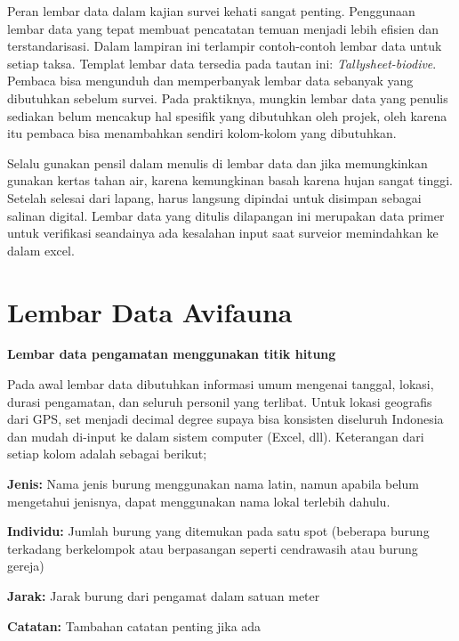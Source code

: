 \documentclass[
]{book}
\begin{document}
Peran lembar data dalam kajian survei kehati sangat penting. Penggunaan lembar data yang tepat membuat pencatatan temuan menjadi lebih efisien dan terstandarisasi. Dalam lampiran ini terlampir contoh-contoh lembar data untuk setiap taksa. Templat lembar data tersedia pada tautan ini: \emph{Tallysheet-biodive}. Pembaca bisa mengunduh dan memperbanyak lembar data sebanyak yang dibutuhkan sebelum survei. Pada praktiknya, mungkin lembar data yang penulis sediakan belum mencakup hal spesifik yang dibutuhkan oleh projek, oleh karena itu pembaca bisa menambahkan sendiri kolom-kolom yang dibutuhkan.

Selalu gunakan pensil dalam menulis di lembar data dan jika memungkinkan gunakan kertas tahan air, karena kemungkinan basah karena hujan sangat tinggi. Setelah selesai dari lapang, harus langsung dipindai untuk disimpan sebagai salinan digital. Lembar data yang ditulis dilapangan ini merupakan data primer untuk verifikasi seandainya ada kesalahan input saat surveior memindahkan ke dalam excel.

\hypertarget{lembar-data-avifauna}{%
\section*{Lembar Data Avifauna}\label{lembar-data-avifauna}}

\textbf{Lembar data pengamatan menggunakan titik hitung}

Pada awal lembar data dibutuhkan informasi umum mengenai tanggal, lokasi, durasi pengamatan, dan seluruh personil yang terlibat. Untuk lokasi geografis dari GPS, set menjadi decimal degree supaya bisa konsisten diseluruh Indonesia dan mudah di-input ke dalam sistem computer (Excel, dll). Keterangan dari setiap kolom adalah sebagai berikut;

\textbf{Jenis:} Nama jenis burung menggunakan nama latin, namun apabila belum mengetahui jenisnya, dapat menggunakan nama lokal terlebih dahulu.

\textbf{Individu:} Jumlah burung yang ditemukan pada satu spot (beberapa burung terkadang berkelompok atau berpasangan seperti cendrawasih atau burung gereja)

\textbf{Jarak:} Jarak burung dari pengamat dalam satuan meter

\textbf{Catatan:} Tambahan catatan penting jika ada
\end{document}
